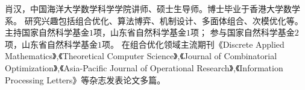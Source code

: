 %
%

\par{
\fontsize{9.65pt}{\baselineskip}\selectfont
肖汉，中国海洋大学数学科学学院讲师、硕士生导师。博士毕业于香港大学数学系。
研究兴趣包括组合优化、算法博弈、机制设计、多面体组合、次模优化等。
主持国家自然科学基金$1$项，山东省自然科学基金$1$项；
参与国家自然科学基金$2$项，山东省自然科学基金$1$项。
在组合优化领域主流期刊《Discrete Applied Mathematics》,《Theoretical Computer Science》,《Journal of Combinatorial Optimization》,《Asia-Pacific Journal of Operational Research》,《Information Processing Letters》等杂志发表论文多篇。
}